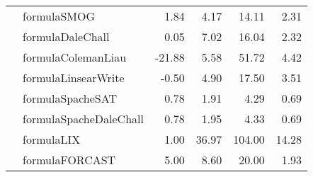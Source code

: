 \begin{tabular}{|l|l|r|r|r|r|}
 & formulaSMOG & 1.84 & 4.17 & 14.11 & 2.31 \\ \cline{2-6}
 & formulaDaleChall & 0.05 & 7.02 & 16.04 & 2.32 \\ \cline{2-6}
 & formulaColemanLiau & -21.88 & 5.58 & 51.72 & 4.42 \\ \cline{2-6}
 & formulaLinsearWrite & -0.50 & 4.90 & 17.50 & 3.51 \\ \cline{2-6}
 & formulaSpacheSAT & 0.78 & 1.91 & 4.29 & 0.69 \\ \cline{2-6}
 & formulaSpacheDaleChall & 0.78 & 1.95 & 4.33 & 0.69 \\ \cline{2-6}
 & formulaLIX & 1.00 & 36.97 & 104.00 & 14.28 \\ \cline{2-6}
 & formulaFORCAST & 5.00 & 8.60 & 20.00 & 1.93 \\ \hline
\end{tabular}